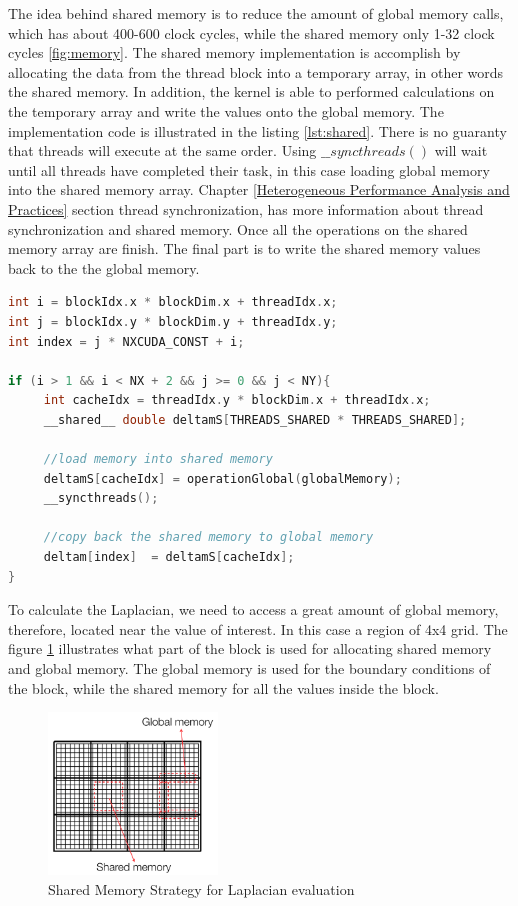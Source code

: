 The idea behind shared memory is to reduce the amount of global memory calls, which has about 400-600 clock cycles, while the shared memory only 1-32 clock cycles \ref{fig:memory}. The shared memory implementation is accomplish by allocating the data from the thread block into a temporary array, in other words the shared memory. In addition, the kernel is able to performed calculations on the temporary array and write the values onto the global memory. The implementation code is illustrated in the listing \ref{lst:shared}. There is no guaranty that threads will execute at the same order. Using $\_\_syncthreads()$ will wait until all threads have completed their task, in this case loading global memory into the shared memory array. Chapter \ref{Heterogeneous Performance Analysis and Practices} section thread synchronization, has more information about thread synchronization and shared memory. Once all the operations on the shared memory array are finish. The final part is to write the shared memory values back to the the global memory.

\begin{lstlisting}[language=C++, label={lst:shared}, caption={Shared memory}]
int i = blockIdx.x * blockDim.x + threadIdx.x;
int j = blockIdx.y * blockDim.y + threadIdx.y;
int index = j * NXCUDA_CONST + i;

if (i > 1 && i < NX + 2 && j >= 0 && j < NY){
     int cacheIdx = threadIdx.y * blockDim.x + threadIdx.x;
     __shared__ double deltamS[THREADS_SHARED * THREADS_SHARED];

	 //load memory into shared memory
     deltamS[cacheIdx] = operationGlobal(globalMemory);
     __syncthreads();

	 //copy back the shared memory to global memory
     deltam[index]  = deltamS[cacheIdx];
}
\end{lstlisting}

To calculate the Laplacian, we need to access a great amount of global memory, therefore, located near the value of interest. In this case a region of 4x4 grid. The figure \ref{fig:shared} illustrates what part of the block is used for allocating shared memory and global memory. The global memory is used for the boundary conditions of the block, while the shared memory for all the values inside the block.

\begin{figure}[htbp]
	\centering
		\includegraphics[width=0.4\textwidth]{Figures/shared.png}
		\smallskip
	\caption[Shared Memory Strategy]{Shared Memory Strategy for Laplacian evaluation }
	\label{fig:shared}
\end{figure}

